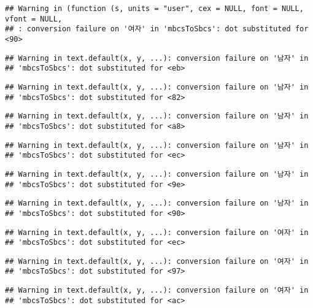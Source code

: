 \documentclass[
]{article}
\begin{document}
\begin{verbatim}
## Warning in (function (s, units = "user", cex = NULL, font = NULL, vfont = NULL,
## : conversion failure on '여자' in 'mbcsToSbcs': dot substituted for <90>
\end{verbatim}

\begin{verbatim}
## Warning in text.default(x, y, ...): conversion failure on '남자' in
## 'mbcsToSbcs': dot substituted for <eb>
\end{verbatim}

\begin{verbatim}
## Warning in text.default(x, y, ...): conversion failure on '남자' in
## 'mbcsToSbcs': dot substituted for <82>
\end{verbatim}

\begin{verbatim}
## Warning in text.default(x, y, ...): conversion failure on '남자' in
## 'mbcsToSbcs': dot substituted for <a8>
\end{verbatim}

\begin{verbatim}
## Warning in text.default(x, y, ...): conversion failure on '남자' in
## 'mbcsToSbcs': dot substituted for <ec>
\end{verbatim}

\begin{verbatim}
## Warning in text.default(x, y, ...): conversion failure on '남자' in
## 'mbcsToSbcs': dot substituted for <9e>
\end{verbatim}

\begin{verbatim}
## Warning in text.default(x, y, ...): conversion failure on '남자' in
## 'mbcsToSbcs': dot substituted for <90>
\end{verbatim}

\begin{verbatim}
## Warning in text.default(x, y, ...): conversion failure on '여자' in
## 'mbcsToSbcs': dot substituted for <ec>
\end{verbatim}

\begin{verbatim}
## Warning in text.default(x, y, ...): conversion failure on '여자' in
## 'mbcsToSbcs': dot substituted for <97>
\end{verbatim}

\begin{verbatim}
## Warning in text.default(x, y, ...): conversion failure on '여자' in
## 'mbcsToSbcs': dot substituted for <ac>
\end{verbatim}
\end{document}
